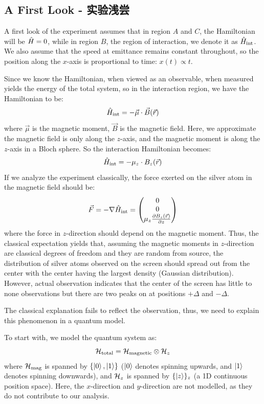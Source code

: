 \subsection{A First Look - 实验浅尝}
A first look of the experiment assumes that in region $A$ and $C$, the Hamiltonian will be $\hat{H} = 0$, while in region $B$, the region of interaction, we denote it as $\hat{H}_{\text{int}}$. We also assume that the speed at emittance remains constant throughout, so the position along the $x$-axis is proportional to time: $x(t) \propto t$. \par
Since we know the Hamiltonian, when viewed as an observable, when measured yields the energy of the total system, so in the interaction region, we have the Hamiltonian to be:
$$\hat{H}_{\text{int}} = -\vec{\mu} \cdot \vec{B}(\vec{r})$$
where $\vec{\mu}$ is the magnetic moment, $\vec{B}$ is the magnetic field. Here, we approximate the magnetic field is only along the $z$-axis, and the magnetic moment is along the $z$-axis in a Bloch sphere. So the interaction Hamiltonian becomes:
$$\hat{H}_{\text{int}} = -\mu_z \cdot B_z(\vec{r})$$
If we analyze the experiment classically, the force exerted on the silver atom in the magnetic field should be:
$$\vec{F} = -\nabla\hat{H}_{\text{int}} = \begin{pmatrix}
    0 \\ 0 \\
    \mu_z \pdv{B_z(\vec{r})}{z}
\end{pmatrix}$$
where the force in $z$-direction should depend on the magnetic moment. Thus, the classical expectation yields that, assuming the magnetic moments in $z$-direction are classical degrees of freedom and they are random from source, the distribution of silver atoms observed on the screen should spread out from the center with the center having the largest density (Gaussian distribution). However, actual observation indicates that the center of the screen has little to none observations but there are two peaks on at positions $+\Delta$ and $-\Delta$. \par
The classical explanation fails to reflect the observation, thus, we need to explain this phenomenon in a quantum model. \par
To start with, we model the quantum system as:
$$\mathcal{H}_{\text{total}} = \mathcal{H}_{\text{magnetic}} \otimes \mathcal{H}_z$$
where $\mathcal{H}_{\text{mag}}$ is spanned by $\{\ket{0}, \ket{1}\}$ ($\ket{0}$ denotes spinning upwards, and $\ket{1}$ denotes spinning downwards), and $\mathcal{H}_z$ is spanned by $\{\ket{z}\}_z$ (a 1D continuous position space). Here, the $x$-direction and $y$-direction are not modelled, as they do not contribute to our analysis. \par
